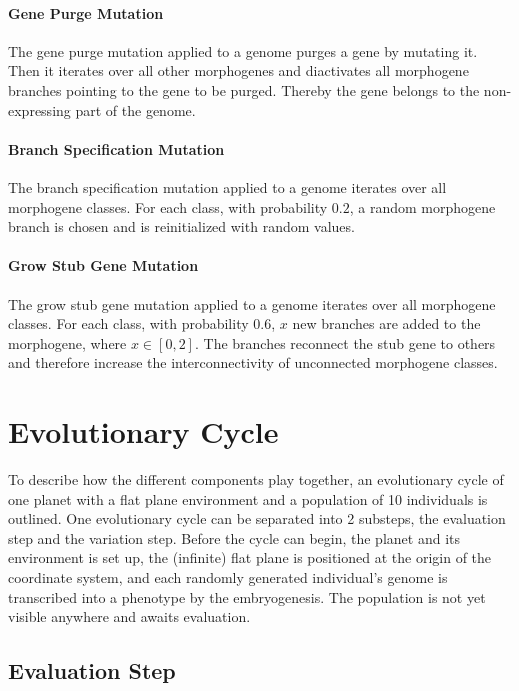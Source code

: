 \documentclass[main]{subfiles}
\begin{document}
\paragraph{Gene Purge Mutation}

The gene purge mutation applied to a genome purges a gene by mutating it. %
%
Then it iterates over all other morphogenes and diactivates all morphogene branches pointing to the gene to be purged. %
%
Thereby the gene belongs to the non-expressing part of the genome.

\paragraph{Branch Specification Mutation}

The branch specification mutation applied to a genome iterates over all morphogene classes. %
%
For each class, with probability $0.2$, a random morphogene branch is chosen and is reinitialized with random values. 

\paragraph{Grow Stub Gene Mutation}

The grow stub gene mutation applied to a genome iterates over all morphogene classes. %
%
For each class, with probability $0.6$, $x$ new branches are added to the morphogene, where $x \in [0,2]$. %
%
The branches reconnect the stub gene to others and therefore increase the interconnectivity of unconnected morphogene classes.

\section{Evolutionary Cycle}

To describe how the different components play together, an evolutionary cycle of one planet with a flat plane environment and a population of 10 individuals is outlined. %
%
One evolutionary cycle can be separated into 2 substeps, the evaluation step and the variation step. %
%
Before the cycle can begin, the planet and its environment is set up, the (infinite) flat plane is positioned at the origin of the coordinate system, and each randomly generated individual's genome is transcribed into a phenotype by the embryogenesis. %
%
The population is not yet visible anywhere and awaits evaluation.

\subsection{Evaluation Step}
\end{document}
